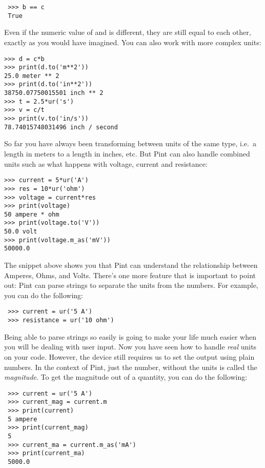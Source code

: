 \begin{verbatim}
 >>> b == c
 True
\end{verbatim}

Even if the numeric value of  and  is different, they are still equal to each other, exactly as you would have imagined. You can also work with more complex units:

\begin{verbatim}
>>> d = c*b
>>> print(d.to('m**2'))
25.0 meter ** 2
>>> print(d.to('in**2'))
38750.07750015501 inch ** 2
>>> t = 2.5*ur('s')
>>> v = c/t
>>> print(v.to('in/s'))
78.74015748031496 inch / second
\end{verbatim}

So far you have always been transforming between units of the same type, i.e.\ a length in meters to a length in inches, etc. But Pint can also handle combined units such as what happens with voltage, current and resistance:

\begin{verbatim}
>>> current = 5*ur('A')
>>> res = 10*ur('ohm')
>>> voltage = current*res
>>> print(voltage)
50 ampere * ohm
>>> print(voltage.to('V'))
50.0 volt
>>> print(voltage.m_as('mV'))
50000.0
\end{verbatim}

The snippet above shows you that Pint can understand the relationship between Amperes, Ohms, and Volts. There's one more feature that is important to point out: Pint can parse strings to separate the units from the numbers. For example, you can do the following:

\begin{verbatim}
 >>> current = ur('5 A')
 >>> resistance = ur('10 ohm')
\end{verbatim}

Being able to parse strings so easily is going to make your life much easier when you will be dealing with user input. Now you have seen how to handle \emph{real} units on your code. However, the device still requires us to set the output using plain numbers. In the context of Pint, just the number, without the units is called the \emph{magnitude}. To get the magnitude out of a quantity, you can do the following:

\begin{verbatim}
 >>> current = ur('5 A')
 >>> current_mag = current.m
 >>> print(current)
 5 ampere
 >>> print(current_mag)
 5
 >>> current_ma = current.m_as('mA')
 >>> print(current_ma)
 5000.0
\end{verbatim}

